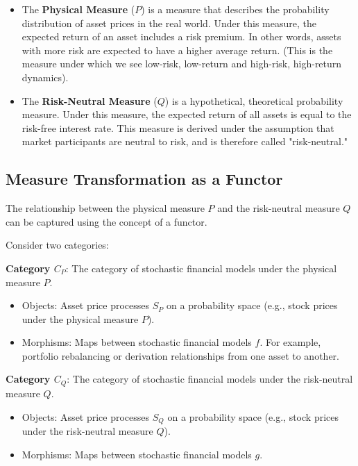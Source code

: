 \documentclass[uplatex,a4j,12pt,dvipdfmx]{jsarticle}
\begin{document}
\begin{itemize}
	\item The \textbf{Physical Measure} ($P$) is a measure that describes the probability distribution of asset prices in the real world. Under this measure, the expected return of an asset includes a risk premium. In other words, assets with more risk are expected to have a higher average return. (This is the measure under which we see low-risk, low-return and high-risk, high-return dynamics).
	\item The \textbf{Risk-Neutral Measure} ($Q$) is a hypothetical, theoretical probability measure. Under this measure, the expected return of all assets is equal to the risk-free interest rate. This measure is derived under the assumption that market participants are neutral to risk, and is therefore called "risk-neutral."
\end{itemize}

\subsection{Measure Transformation as a Functor}

The relationship between the physical measure $P$ and the risk-neutral measure $Q$ can be captured using the concept of a functor.

\medskip

Consider two categories:

\textbf{Category $C_{P}$}: The category of stochastic financial models under the physical measure $P$.
\begin{itemize}
	\item Objects: Asset price processes $S_{P}$ on a probability space (e.g., stock prices under the physical measure $P$).
	\item Morphisms: Maps between stochastic financial models $f$. For example, portfolio rebalancing or derivation relationships from one asset to another.
\end{itemize}

\medskip

\textbf{Category $C_{Q}$}: The category of stochastic financial models under the risk-neutral measure $Q$.
\begin{itemize}
	\item Objects: Asset price processes $S_{Q}$ on a probability space (e.g., stock prices under the risk-neutral measure $Q$).
	\item Morphisms: Maps between stochastic financial models $g$.
\end{itemize}
\end{document}

